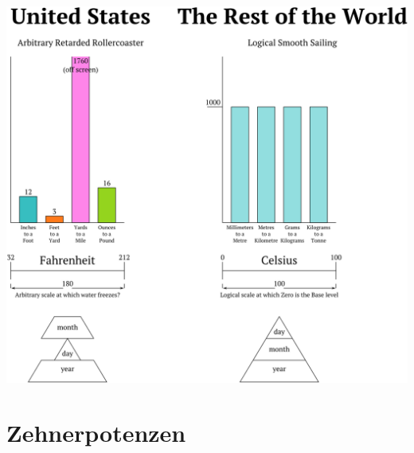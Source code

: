 \begin{frame}

    \begin{center}
        \includegraphics[height=1\textheight]{e01/imperial_vs_metric++.png}
        \tiny \hyperlink{refs}{\cite{devi}}
    \end{center}

\end{frame}

\section{Zehnerpotenzen}

